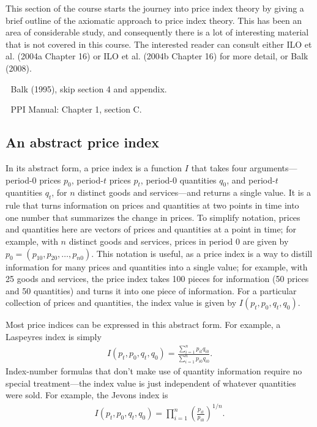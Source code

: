 \documentclass[]{article}
\begin{document}
This section of the course starts the journey into price index theory by giving a brief outline of the axiomatic approach to price index theory. This has been an area of considerable study, and consequently there is a lot of interesting material that is not covered in this course. The interested reader can consult either ILO et al. (2004a Chapter 16) or ILO et al. (2004b Chapter 16) for more detail, or Balk (2008).

📖 Balk (1995), skip section 4 and appendix.

📖 PPI Manual: Chapter 1, section C.

\hypertarget{an-abstract-price-index}{%
\subsection{An abstract price index}\label{an-abstract-price-index}}

In its abstract form, a price index is a function \(I\) that takes four arguments---period-0 prices \(p_{0}\), period-\(t\) prices \(p_{t}\), period-0 quantities \(q_{0}\), and period-\(t\) quantities \(q_{t}\), for \(n\) distinct goods and services---and returns a single value. It is a rule that turns information on prices and quantities at two points in time into one number that summarizes the change in prices. To simplify notation, prices and quantities here are vectors of prices and quantities at a point in time; for example, with \(n\) distinct goods and services, prices in period 0 are given by \(p_0 = (p_{10}, p_{20}, \ldots, p_{n0})\). This notation is useful, as a price index is a way to distill information for many prices and quantities into a single value; for example, with 25 goods and services, the price index takes 100 pieces for information (50 prices and 50 quantities) and turns it into one piece of information. For a particular collection of prices and quantities, the index value is given by \(I(p_{t}, p_{0}, q_{t}, q_{0})\).

Most price indices can be expressed in this abstract form. For example, a Laspeyres index is simply
\begin{align*}
I(p_{t}, p_{0}, q_{t}, q_{0}) = \frac{\sum_{i=1}^{n} p_{it}q_{i0}}{\sum_{i=1}^{n} p_{i0}q_{i0}}.
\end{align*}
Index-number formulas that don't make use of quantity information require no special treatment---the index value is just independent of whatever quantities were sold. For example, the Jevons index is
\begin{align*}
I(p_{t}, p_{0}, q_{t}, q_{0}) = \prod_{i=1}^{n} \left(\frac{p_{it}}{p_{i0}}\right)^{1 / n}.
\end{align*}
\end{document}
